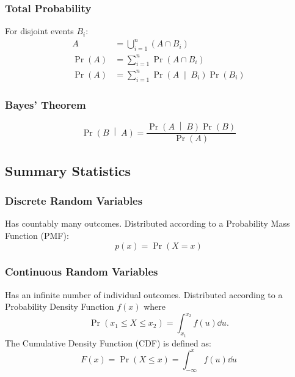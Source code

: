 \documentclass{article}
\begin{document}
\begin{multicols}{3}
    \subsubsection*{Total Probability}
    For disjoint events $B_i$:
    \begin{align*}
        A                     & = \bigcup\limits_{i=1}^n \left( A \cap B_i \right)                            \\
        \Pr{\left( A \right)} & = \sum_{i=1}^n \Pr{\left( A \cap B_i \right)}                                 \\
        \Pr{\left( A \right)} & = \sum_{i=1}^n \Pr{\left( A \;\middle|\; B_i \right)} \Pr{\left( B_i \right)}
    \end{align*}
    \subsubsection*{Bayes' Theorem}
    \begin{equation*}
        \Pr{\left(B \;\middle|\; A\right)} = \frac{\Pr{\left( A \;\middle|\; B \right)}\Pr{\left( B \right)}}{\Pr{\left( A \right)}}
    \end{equation*}
    \subsection*{Summary Statistics}
    \subsubsection*{Discrete Random Variables}
    Has countably many outcomes. Distributed according to a
    Probability Mass Function (PMF):
    \begin{equation*}
        p(x) = \Pr{\left( X = x \right)}
    \end{equation*}
    \subsubsection*{Continuous Random Variables}
    Has an infinite number of individual outcomes. Distributed according to a
    Probability Density Function $f(x)$ where
    \begin{equation*}
        \Pr{\left( x_1 \leq X \leq x_2 \right)} = \int_{x_1}^{x_2} f(u) \dd{u}.
    \end{equation*}
    The Cumulative Density Function (CDF)
    is defined as:
    \begin{equation*}
        F(x) = \Pr{\left( X \leq x \right)} = \int_{-\infty}^x f(u) \dd{u}
    \end{equation*}

\end{multicols}
\end{document}

